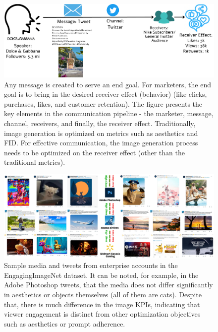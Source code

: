     
 \begin{figure}[h]
   \centering
   \includegraphics[width=\textwidth]{images/factors-of-communication_compressed.pdf}
   \caption{Any message is created to serve an end goal. For marketers, the end goal is to bring in the desired receiver effect (behavior) (like clicks, purchases, likes, and customer retention). The figure presents the key elements in the communication pipeline - the marketer, message, channel, receivers, and finally, the receiver effect. Traditionally, image generation is optimized on metrics such as aesthetics and FID. For effective communication, the image generation process needs to be optimized on the receiver effect (other than the traditional metrics).  \label{fig:factors-of-communication-eoig}}
 \end{figure}

\begin{landscape}

 \begin{figure}[h]
   \centering
   \includegraphics[width=1.5\textwidth]{images/boigBench_v1_compressed.pdf}
   \caption{Sample media and tweets from enterprise accounts in the EngagingImageNet dataset. It can be noted, for example, in the Adobe Photoshop tweets, that the media does not differ significantly in aesthetics or objects themselves (all of them are cats). Despite that, there is much difference in the image KPIs, indicating that viewer engagement is distinct from other optimization objectives such as aesthetics or prompt adherence.
   }\label{fig:EngagingImageNet-dataset-samples}
 \end{figure}
\end{landscape}

